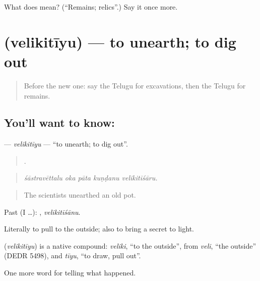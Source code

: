 \begin{tcolorbox}[breakable,colback=teal!4,colframe=teal!35!black,title={Before you move on}]
What does  mean? (\textquotedblleft{}Remains; relics\textquotedblright{}.) Say it once more.
\end{tcolorbox}
\section[\texorpdfstring{\te{వెలికితీయు} (velikitīyu)}{వెలికితీయు (velikitīyu)}]{ (velikitīyu) — to unearth; to dig out}

\label{lesson:TE-C367-velikitiyu}



\begin{quote}
Before the new one: say the Telugu for excavations, then the Telugu for remains.
\end{quote}

\subsection*{You'll want to know: }
\textbf{} — \emph{velikitīyu} — \textquotedblleft{}to unearth; to dig out\textquotedblright{}.

\begin{quote}
    .
\end{quote}

\begin{quote}
\emph{śāstravēttalu oka pāta kuṇḍanu velikitīśāru.}
\end{quote}

\begin{quote}
The scientists unearthed an old pot.
\end{quote}

Past (I …): , \emph{velikitīśānu}.

Literally to pull to the outside; also to bring a secret to light.

\begin{cousinweb}
\textbf{} (\emph{velikitīyu}) is a native compound: \emph{veliki}, \textquotedblleft{}to the outside\textquotedblright{}, from \emph{veli}, \textquotedblleft{}the outside\textquotedblright{} (DEDR 5498), and \emph{tīyu}, \textquotedblleft{}to draw, pull out\textquotedblright{}.
\end{cousinweb}

\begin{grammarlens}[title={What you've built}]
One more word for telling what happened.
\end{grammarlens}

